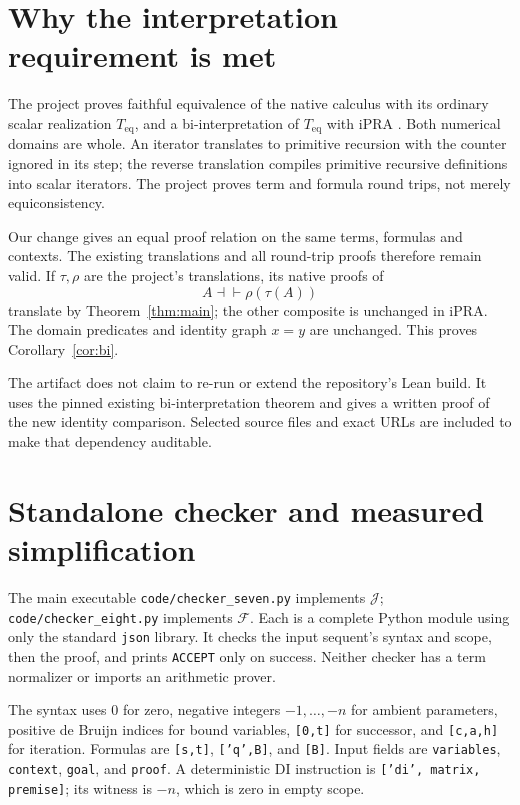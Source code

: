 \documentclass[11pt]{article}
\newcommand{\Fcal}{\mathcal F}
\newcommand{\Jcal}{\mathcal J}
\newcommand{\ipra}{\mathrm{iPRA}}
\begin{document}
\section{Why the interpretation requirement is met}

The project proves faithful equivalence of the native calculus with its
ordinary scalar realization \(T_{\mathrm{eq}}\), and a bi-interpretation of
\(T_{\mathrm{eq}}\) with \(\ipra\) \cite{repo,bridge}.
Both numerical domains are whole. An iterator translates to primitive
recursion with the counter ignored in its step; the reverse translation
compiles primitive recursive definitions into scalar iterators.
The project proves term and formula round trips, not merely
equiconsistency.

Our change gives an equal proof relation on the same terms, formulas and
contexts. The existing translations and all round-trip proofs therefore
remain valid. If \(\tau,\rho\) are the project's translations, its native
proofs of
\[
 A\dashv\vdash \rho(\tau(A))
\]
translate by Theorem~\ref{thm:main}; the other composite is unchanged in
\(\ipra\). The domain predicates and identity graph \(x=y\) are unchanged.
This proves Corollary~\ref{cor:bi}.

The artifact does not claim to re-run or extend the repository's Lean build.
It uses the pinned existing bi-interpretation theorem and gives a written
proof of the new identity comparison. Selected source files and exact URLs
are included to make that dependency auditable.

\section{Standalone checker and measured simplification}

The main executable \texttt{code/checker\_seven.py} implements \(\Jcal\);
\texttt{code/checker\_eight.py} implements \(\Fcal\).
Each is a complete Python module using only the standard \texttt{json}
library. It checks the input sequent's syntax and scope, then the proof,
and prints \texttt{ACCEPT} only on success.
Neither checker has a term normalizer or imports an arithmetic prover.

The syntax uses \(0\) for zero, negative integers \(-1,\ldots,-n\) for
ambient parameters, positive de Bruijn indices for bound variables,
\texttt{[0,t]} for successor, and \texttt{[c,a,h]} for iteration.
Formulas are \texttt{[s,t]}, \texttt{['q',B]}, and \texttt{[B]}.
Input fields are \texttt{variables}, \texttt{context}, \texttt{goal},
and \texttt{proof}. A deterministic DI instruction is
\texttt{['di', matrix, premise]}; its witness is \(-n\), which is zero
in empty scope.
\end{document}

